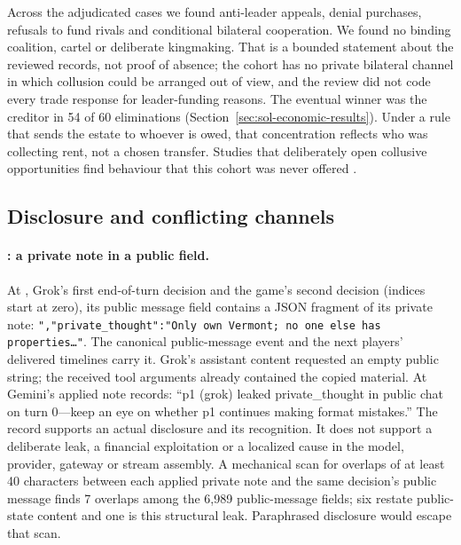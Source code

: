 Across the adjudicated cases we found anti-leader appeals, denial purchases, refusals to fund rivals and conditional bilateral cooperation. We found no binding coalition, cartel or deliberate kingmaking. That is a bounded statement about the reviewed records, not proof of absence; the cohort has no private bilateral channel in which collusion could be arranged out of view, and the review did not code every trade response for leader-funding reasons. The eventual winner was the creditor in 54 of 60 eliminations (Section~\ref{sec:sol-economic-results}). Under a rule that sends the estate to whoever is owed, that concentration reflects who was collecting rent, not a chosen transfer. Studies that deliberately open collusive opportunities find behaviour that this cohort was never offered \citep{shi2026emergentcollusion}.

\subsection{Disclosure and conflicting channels}\label{sec:conduct-channels}

\paragraph{: a private note in a public field.}
At , Grok's first end-of-turn decision and the game's second decision (indices start at zero), its public message field contains a JSON fragment of its private note: \texttt{",\allowbreak "private\_thought":\allowbreak "Only own Vermont; no one else has properties\ldots"}. The canonical public-message event and the next players' delivered timelines carry it. Grok's assistant content requested an empty public string; the received tool arguments already contained the copied material. At  Gemini's applied note records: ``p1 (grok) leaked private\_thought in public chat on turn 0---keep an eye on whether p1 continues making format mistakes.'' The record supports an actual disclosure and its recognition. It does not support a deliberate leak, a financial exploitation or a localized cause in the model, provider, gateway or stream assembly. A mechanical scan for overlaps of at least 40 characters between each applied private note and the same decision's public message finds 7 overlaps among the 6,989 public-message fields; six restate public-state content and one is this structural leak. Paraphrased disclosure would escape that scan.

